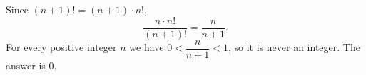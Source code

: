 Since $(n+1)!=(n+1)\cdot n!$,
\[\dfrac{n\cdot n!}{(n+1)!}=\dfrac{n}{n+1}.\]
For every positive integer $n$ we have $0<\dfrac{n}{n+1}<1$, so it is never an integer. The answer is $\boxed{0}$.
